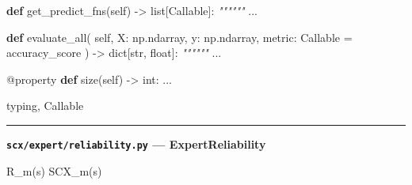 \documentclass[
  12pt,
]{article}
\newenvironment{Shaded}{}{}
\newcommand{\AttributeTok}[1]{\textcolor[rgb]{0.49,0.56,0.16}{#1}}
\newcommand{\BuiltInTok}[1]{\textcolor[rgb]{0.00,0.50,0.00}{#1}}
\newcommand{\CommentTok}[1]{\textcolor[rgb]{0.38,0.63,0.69}{\textit{#1}}}
\newcommand{\KeywordTok}[1]{\textcolor[rgb]{0.00,0.44,0.13}{\textbf{#1}}}
\newcommand{\NormalTok}[1]{#1}
\newcommand{\OperatorTok}[1]{\textcolor[rgb]{0.40,0.40,0.40}{#1}}
\newcommand{\VariableTok}[1]{\textcolor[rgb]{0.10,0.09,0.49}{#1}}
\begin{document}
\begin{Shaded}
\begin{Highlighting}[]
    \KeywordTok{def}\NormalTok{ get\_predict\_fns(}\VariableTok{self}\NormalTok{) }\OperatorTok{{-}\textgreater{}} \BuiltInTok{list}\NormalTok{[Callable]:}
        \CommentTok{""""""}
\NormalTok{        ...}

    \KeywordTok{def}\NormalTok{ evaluate\_all(}
        \VariableTok{self}\NormalTok{, X: np.ndarray, y: np.ndarray,}
\NormalTok{        metric: Callable }\OperatorTok{=}\NormalTok{ accuracy\_score}
\NormalTok{    ) }\OperatorTok{{-}\textgreater{}} \BuiltInTok{dict}\NormalTok{[}\BuiltInTok{str}\NormalTok{, }\BuiltInTok{float}\NormalTok{]:}
        \CommentTok{""""""}
\NormalTok{        ...}

    \AttributeTok{@property}
    \KeywordTok{def}\NormalTok{ size(}\VariableTok{self}\NormalTok{) }\OperatorTok{{-}\textgreater{}} \BuiltInTok{int}\NormalTok{:}
\NormalTok{        ...}
\end{Highlighting}
\end{Shaded}

typing, Callable

\begin{center}\rule{0.5\linewidth}{0.5pt}\end{center}

\textbf{\texttt{scx/expert/reliability.py} --- ExpertReliability}

 R\_m(s)  SCX\_m(s)
\end{document}
